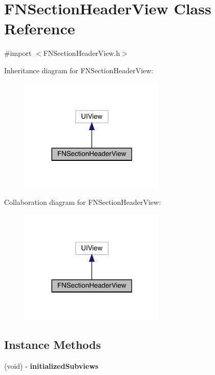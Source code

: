 \hypertarget{interface_f_n_section_header_view}{}\section{F\+N\+Section\+Header\+View Class Reference}
\label{interface_f_n_section_header_view}


{\ttfamily \#import $<$F\+N\+Section\+Header\+View.\+h$>$}



Inheritance diagram for F\+N\+Section\+Header\+View\+:\nopagebreak
\begin{figure}[H]
\begin{center}
\leavevmode
\includegraphics[width=197pt]{interface_f_n_section_header_view__inherit__graph}
\end{center}
\end{figure}


Collaboration diagram for F\+N\+Section\+Header\+View\+:\nopagebreak
\begin{figure}[H]
\begin{center}
\leavevmode
\includegraphics[width=197pt]{interface_f_n_section_header_view__coll__graph}
\end{center}
\end{figure}
\subsection*{Instance Methods}
\begin{DoxyCompactItemize}
\item 
\mbox{\label{interface_f_n_section_header_view_ab70ca154a8f61793caff56bd994528bc}} 
(void) -\/ {\bfseries initialized\+Subviews}
\end{DoxyCompactItemize}
